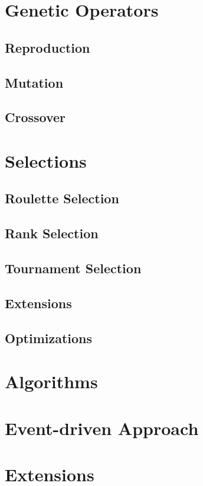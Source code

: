 \section{Genetic Operators}\label{section:genetic-operators}
\todo

\subsection{Reproduction}
\todo

\subsection{Mutation}
\todo

\subsection{Crossover}
\todo

\section{Selections}
\todo

\subsection{Roulette Selection}
\todo

\subsection{Rank Selection}
\todo

\subsection{Tournament Selection}
\todo

\subsection{Extensions}
\todo

\subsection{Optimizations}
\todo

\section{Algorithms}
\todo

\section{Event-driven Approach}
\todo

\section{Extensions}
\todo
